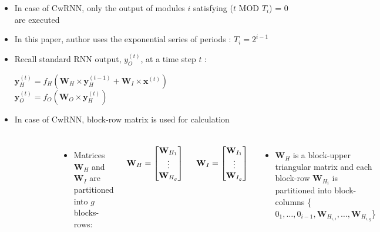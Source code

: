 \documentclass{beamer}
\begin{document}
\frame
{
	\begin{itemize}
		\item In case of CwRNN, only the output of modules ${i}$ satisfying (${t}$ MOD ${T_i}$) = 0 are executed		
		\item In this paper, author uses the exponential series of periods : ${T_i = 2^{i-1} }$
		\item Recall standard RNN output, ${y_O^{(t)}}$, at a time step ${t}$ : \\
		\begin{center}
			${ \mathbf{y}_H^{(t)} = f_H ( \mathbf{W}_H\times \mathbf{y}_H^{(t-1)} + \mathbf{W}_I\times \mathbf{x}^{(t)}) }$ \\
			${ \mathbf{y}_O^{(t)} = f_O ( \mathbf{W}_O \times \mathbf{y}_H^{(t)} ) }$
		\end{center}			
		\item In case of CwRNN, block-row matrix is used for calculation
	\end{itemize}	
}
\frame
{
	\begin{columns}
	\begin{figure}[ht]  
		\begin{center}
			\includegraphics[width=2.1in]{Images/cwrnn_calculation.png}   
		\end{center}   
	\end{figure}	
						
	\begin{itemize}
		\item Matrices ${\mathbf{W}_H}$ and ${\mathbf{W}_I}$ are partitioned into ${g}$ blocks-rows: 
	\end{itemize}	
	\[
	\mathbf{W}_H=
  \begin{bmatrix}
    \mathbf{W}_{H_1} \\
    \vdots \\
    \mathbf{W}_{H_g} 
  \end{bmatrix}
  \hspace{0.5cm}
  \mathbf{W}_I=
  \begin{bmatrix}
    \mathbf{W}_{I_1} \\
    \vdots \\
    \mathbf{W}_{I_g} 
  \end{bmatrix}
\]
  	\begin{itemize}
  		\item ${ \mathbf{W}_H }$ is a block-upper triangular matrix and each block-row ${\mathbf{W}_{H_i}}$ is partitioned into block-columns 
  		\{${0_1, \dots, 0_{i-1}, \mathbf{W}_{H_{i,i}}, \dots, \mathbf{W}_{H_{i,g}}}$\}
  	\end{itemize}
  	
	\end{columns}
}
\end{document}
